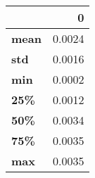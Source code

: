 \begin{tabular}{lr}
\toprule
{} &       0 \\
\midrule
\textbf{mean} &  0.0024 \\
\textbf{std } &  0.0016 \\
\textbf{min } &  0.0002 \\
\textbf{25\% } &  0.0012 \\
\textbf{50\% } &  0.0034 \\
\textbf{75\% } &  0.0035 \\
\textbf{max } &  0.0035 \\
\bottomrule
\end{tabular}
